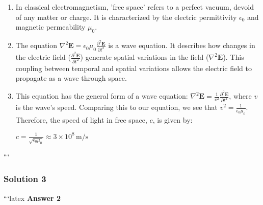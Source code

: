 \documentclass{article}
\begin{document}
\begin{enumerate}
\item In classical electromagnetism, 'free space' refers to a perfect vacuum, devoid of any matter or charge. It is characterized by the electric permittivity $\epsilon_0$ and magnetic permeability $\mu_0$.

\item The equation $\nabla^2 \mathbf{E} = \epsilon_0 \mu_0 \frac{\partial^2 \mathbf{E}}{\partial t^2}$ is a wave equation. It describes how changes in the electric field  ($\frac{\partial^2 \mathbf{E}}{\partial t^2}$)  generate spatial variations in the field ($\nabla^2 \mathbf{E}$). This coupling between temporal and spatial variations allows the electric field to propagate as a wave through space.

\item This equation has the general form of a wave equation: $\nabla^2 \mathbf{E} = \frac{1}{v^2} \frac{\partial^2 \mathbf{E}}{\partial t^2}$, where $v$ is the wave's speed.  Comparing this to our equation, we see that $v^2 = \frac{1}{\epsilon_0 \mu_0}$.  Therefore, the speed of light in free space, $c$, is given by:

$c = \frac{1}{\sqrt{\epsilon_0 \mu_0}} \approx 3 \times 10^8 \, \text{m/s}$ 
\end{enumerate}
```

\subsubsection{Solution 3}
```latex
\textbf{Answer 2}
\end{document}
